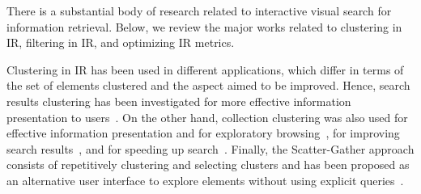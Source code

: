 


There is a substantial body of research related to interactive visual search for information retrieval. 
Below, we review the major works related to clustering in IR, filtering in IR, and optimizing IR metrics.

Clustering in IR has been used in different applications, which differ in terms of the set of elements clustered and the aspect aimed to be improved. 
Hence, search results clustering has been investigated for more effective information presentation to users~\cite{Altingovde2008,Can2004,Toda2005,Levi2018}. 
On the other hand, collection clustering was also used for effective information presentation and for exploratory browsing~\cite{McKeown2002,Hatzivassiloglou2000}, for improving search results~\cite{Liu2004,Altingovde2007,Kurland2011,Kurland2009}, and for speeding up search~\cite{Salton1971,Qumsiyeh2015,Dimond2015}.
Finally, the Scatter-Gather approach consists of repetitively clustering and selecting clusters and has been proposed as an alternative user interface to explore elements without using explicit queries~\cite{Cutting1992,Pirolli2007}.

